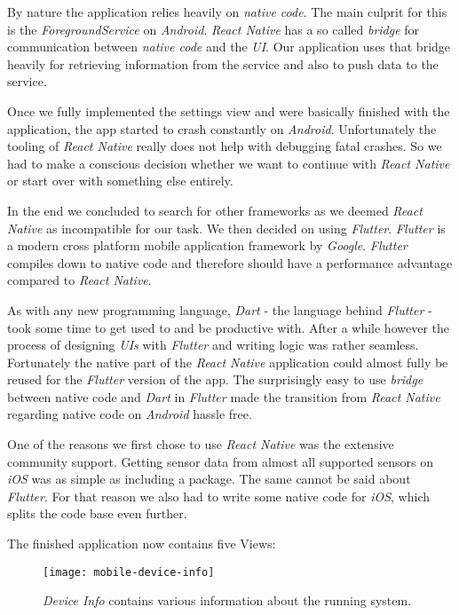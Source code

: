 By nature the application relies heavily on \textit{native code}. The main culprit for this is the
\textit{ForegroundService} on \textit{Android}. \textit{React Native} has a so called
\textit{bridge} for communication between \textit{native code} and the \textit{UI}. Our application
uses that bridge heavily for retrieving information from the service and also to push data to the
service.

Once we fully implemented the settings view and were basically finished with the application, the
app started to crash constantly on \textit{Android}. Unfortunately the tooling of \textit{React
Native} really does not help with debugging fatal crashes. So we had to make a conscious decision
whether we want to continue with \textit{React Native} or start over with something else entirely.

In the end we concluded to search for other frameworks as we deemed \textit{React Native} as
incompatible for our task. We then decided on using \textit{Flutter}. \textit{Flutter} is a modern
cross platform mobile application framework by \textit{Google}. \textit{Flutter} compiles down to
native code and therefore should have a performance advantage compared to \textit{React Native}.

As with any new programming language, \textit{Dart} - the language behind \textit{Flutter} - took
some time to get used to and be productive with. After a while however the process of designing
\textit{UIs} with \textit{Flutter} and writing logic was rather seamless. Fortunately the native
part of the \textit{React Native} application could almost fully be reused for the \textit{Flutter}
version of the app. The surprisingly easy to use \textit{bridge} between native code and
\textit{Dart} in \textit{Flutter} made the transition from \textit{React Native} regarding native
code on \textit{Android} hassle free.

One of the reasons we first chose to use \textit{React Native} was the extensive community support.
Getting sensor data from almost all supported sensors on \textit{iOS} was as simple as including a
package. The same cannot be said about \textit{Flutter}. For that reason we also had to write some
native code for \textit{iOS}, which splits the code base even further.

The finished application now contains five Views:

\begin{figure}[H]
  \centering
  \texttt{[image: mobile-device-info]}
  \caption{\textit{Device Info} contains various information about the running system.}
\end{figure}

